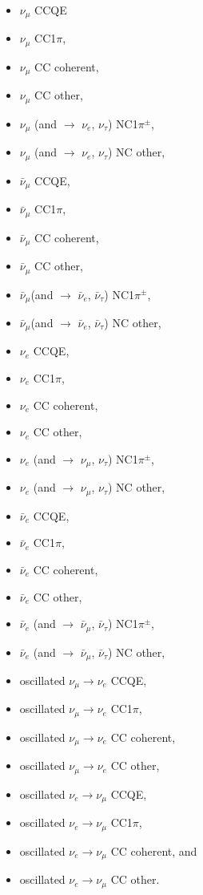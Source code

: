 \begin{itemize}
\item  $\nu_{\mu}$ CCQE
\item  $\nu_{\mu}$ CC1$\pi$, 
\item  $\nu_{\mu}$ CC coherent, 
\item  $\nu_{\mu}$ CC other, 
\item  $\nu_{\mu}$ (and $\rightarrow$ $\nu_{e}$, $\nu_{\tau}$) NC1$\pi^{\pm}$, 
\item  $\nu_{\mu}$ (and $\rightarrow$ $\nu_{e}$, $\nu_{\tau}$) NC other, 
\item  $\bar{\nu}_{\mu}$ CCQE, 
\item  $\bar{\nu}_{\mu}$ CC1$\pi$, 
\item  $\bar{\nu}_{\mu}$ CC coherent, 
\item  $\bar{\nu}_{\mu}$ CC other, 
\item  $\bar{\nu}_{\mu}$(and $\rightarrow$ $\bar{\nu}_{e}$, $\bar{\nu}_{\tau}$) NC1$\pi^{\pm}$, 
\item  $\bar{\nu}_{\mu}$(and $\rightarrow$ $\bar{\nu}_{e}$, $\bar{\nu}_{\tau}$) NC other, 
\item  $\nu_{e}$ CCQE, 
\item  $\nu_{e}$ CC1$\pi$,
\item  $\nu_{e}$ CC coherent,
\item  $\nu_{e}$ CC other,
\item  $\nu_{e}$ (and $\rightarrow$ $\nu_{\mu}$, $\nu_{\tau}$) NC1$\pi^{\pm}$,
\item  $\nu_{e}$ (and $\rightarrow$ $\nu_{\mu}$, $\nu_{\tau}$) NC other,
\item  $\bar{\nu}_{e}$ CCQE, 
\item  $\bar{\nu}_{e}$ CC1$\pi$,
\item  $\bar{\nu}_{e}$ CC coherent,
\item  $\bar{\nu}_{e}$ CC other,
\item  $\bar{\nu}_{e}$ (and $\rightarrow$ $\bar{\nu}_{\mu}$, $\bar{\nu}_{\tau}$) NC1$\pi^{\pm}$,
\item  $\bar{\nu}_{e}$ (and $\rightarrow$ $\bar{\nu}_{\mu}$, $\bar{\nu}_{\tau}$) NC other,
\item  oscillated $\nu_{\mu} \rightarrow \nu_{e}$ CCQE,
\item  oscillated $\nu_{\mu} \rightarrow \nu_{e}$ CC1$\pi$,
\item  oscillated $\nu_{\mu} \rightarrow \nu_{e}$ CC coherent,
\item  oscillated $\nu_{\mu} \rightarrow \nu_{e}$ CC other,
\item  oscillated $\nu_{e} \rightarrow \nu_{\mu}$ CCQE,
\item  oscillated $\nu_{e} \rightarrow \nu_{\mu}$ CC1$\pi$,
\item  oscillated $\nu_{e} \rightarrow \nu_{\mu}$ CC coherent, and
\item  oscillated $\nu_{e} \rightarrow \nu_{\mu}$ CC other.
\end{itemize}

